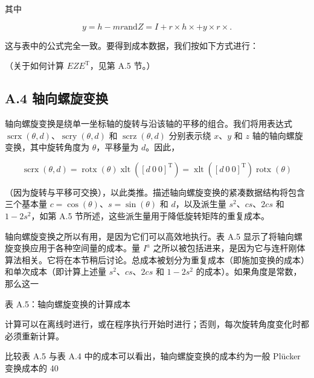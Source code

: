 \documentclass[10pt,a4paper]{book}
\theoremstyle{thmstyle} %
\theoremstyle{defstyle} %
\theoremstyle{prostyle} %
\begin{document}
其中



$$
y = h - m r  \mathrm { a n d }  Z = I + r \times h \times + y \times r \times .
$$



这与表中的公式完全一致。要得到成本数据，我们按如下方式进行：





（关于如何计算 $EZE^{\mathrm{T}}$，见第 A.5 节。）



\subsection{A.4 轴向螺旋变换}





轴向螺旋变换是绕单一坐标轴的旋转与沿该轴的平移的组合。我们将用表达式 $\operatorname{scrx}(\theta, d)$、$\operatorname{scry}(\theta, d)$ 和 $\operatorname{scrz}(\theta, d)$ 分别表示绕 $x$、$y$ 和 $z$ 轴的轴向螺旋变换，其中旋转角度为 $\theta$，平移量为 $d$。因此，



$$
\operatorname { s c r x } ( \theta , d ) = \operatorname { r o t x } ( \theta ) \operatorname { x l t } ( [ d \ 0 \ 0 ] ^{\mathrm { T} } ) = \operatorname { x l t } ( [ d \ 0 \ 0 ] ^{\mathrm { T} } ) \operatorname { r o t x } ( \theta )
$$



（因为旋转与平移可交换），以此类推。描述轴向螺旋变换的紧凑数据结构将包含三个基本量 $c=\cos(\theta)$、$s=\sin(\theta)$ 和 $d$，以及派生量 $s^2$、$cs$、$2cs$ 和 $1-2s^2$，如第 A.5 节所述，这些派生量用于降低旋转矩阵的重复成本。



轴向螺旋变换之所以有用，是因为它们可以高效地执行。表 A.5 显示了将轴向螺旋变换应用于各种空间量的成本。量 $I^{a}$ 之所以被包括进来，是因为它与连杆刚体算法相关。它将在本节稍后讨论。总成本被划分为重复成本（即施加变换的成本）和单次成本（即计算上述量 $s^{2}$、$cs$、$2cs$ 和 $1 - 2s^{2}$ 的成本）。如果角度是常数，那么这一



表 A.5：轴向螺旋变换的计算成本





计算可以在离线时进行，或在程序执行开始时进行；否则，每次旋转角度变化时都必须重新计算。



比较表 A.5 与表 A.4 中的成本可以看出，轴向螺旋变换的成本约为一般 Plücker 变换成本的 40%
\end{document}
